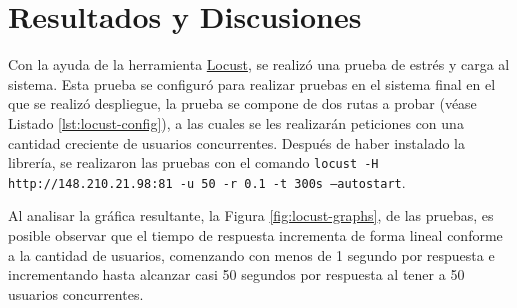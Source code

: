 \chapter{Resultados y Discusiones}




Con la ayuda de la herramienta \href{https://locust.io/}{Locust}, se realizó una prueba de estrés y carga al sistema. Esta prueba se configuró para realizar pruebas en el sistema final en el que se realizó despliegue, la prueba se compone de dos rutas a probar (véase Listado \ref{lst:locust-config}), a las cuales se les realizarán peticiones con una cantidad creciente de usuarios concurrentes. Después de haber instalado la librería, se realizaron las pruebas con el comando \texttt{locust -H http://148.210.21.98:81 -u 50 -r 0.1 -t 300s --autostart}.

Al analisar la gráfica resultante, la Figura \ref{fig:locust-graphs}, de las pruebas, es posible observar que el tiempo de respuesta incrementa de forma lineal conforme a la cantidad de usuarios, comenzando con menos de 1 segundo por respuesta e incrementando hasta alcanzar casi 50 segundos por respuesta al tener a 50 usuarios concurrentes.

